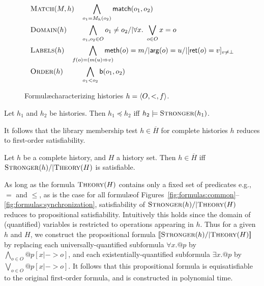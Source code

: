 \begin{figure}
  \footnotesize
  \begin{align*}
    & \textsc{Match}(M,h)
    && \bigwedge_{o_1 = M_h(o_2)} {\sf match}(o_1,o_2) \\
    & \textsc{Domain}(h)
    && \bigwedge_{o_1, o_2 \in O} o_1 \neq o_2 /| \forall x.\ \bigvee_{o\in O} x = o \\
    & \textsc{Labels}(h)
    && \hspace{-5mm} \bigwedge_{f(o) = (m(u) => v)}
      \hspace{-5mm}
      {\sf meth}(o) = m /| {\sf arg}(o) = u /| 
      [{\sf ret}(o) = v]_{v \neq \bot} \\
    & \textsc{Order}(h)
    && \bigwedge_{o_1 < o_2} {\sf b}(o_1, o_2)
  \end{align*}
  \caption{Formul\ae characterizing histories $h = {\langle{O,<,f}\rangle}$.}
  \label{fig:formula:history}
\end{figure}

\begin{lemma}
  \label{lem:stronger_form_complete}
  
  Let $h_1$ and $h_2$ be histories.
  Then $h_1 \preceq h_2$ if{f} $h_2 |= \textsc{Stronger}(h_1)$.

\end{lemma}

\noindent
It follows that the library membership test $h \in \overline{H}$ for complete
histories $h$ reduces to first-order satisfiability.

\begin{theorem}
  \label{th:satisfiability_pending}

  Let $h$ be a complete history, and $H$ a history set.
  Then $h \in \overline{H}$ if{f}
  $\textsc{Stronger}(h) /| \textsc{Theory}(H)$ is satisfiable.

\end{theorem}

As long as the formula $\textsc{Theory}(H)$ contains only a fixed set of
predicates e.g.,~$=$ and $\leq$, as is the case for all formul\ae of
Figures~\ref{fig:formulas:common}--\ref{fig:formulas:synchronization},
satisfiability of $\textsc{Stronger}(h) /| \textsc{Theory}(H)$ reduces to
propositional satisfiability. Intuitively this holds since the domain of
(quantified) variables is restricted to operations appearing in $h$. Thus for a
given $h$ and $H$, we construct the propositional formula
$[\![{\textsc{Stronger}(h) /| \textsc{Theory}(H)}]\!]$ by replacing each
universally-quantified subformula $\forall x. @p$ by $\bigwedge_{o \in O} @p[x
|-> o]$, and each existentially-quantified subformula $\exists x. @p$ by
$\bigvee_{o \in O} @p[x |-> o]$. It follows that this propositional formula is
equisatisfiable to the original first-order formula, and is constructed in
polynomial time.

